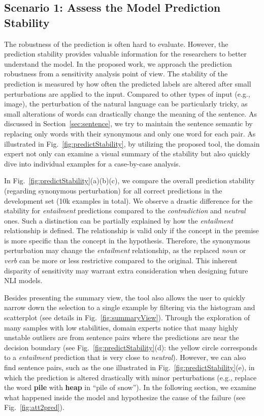 \subsection{Scenario 1: Assess the Model Prediction Stability}
The robustness of the prediction is often hard to evaluate. However, the prediction stability provides valuable information for the researchers to better understand the model.
%
In the proposed work, we approach the prediction robustness from a sensitivity analysis point of view. The stability of the prediction is measured by how often the predicted labels are altered after small perturbations are applied to the input.
%
Compared to other types of input (e.g., image), the perturbation of the natural language can be particularly tricky, as small alterations of words can drastically change the meaning of the sentence. As discussed in Section~\ref{sec:sentence}, we try to maintain the sentence semantic by replacing only words with their synonymous and only one word for each pair.
As illustrated in Fig.~\ref{fig:predictStability}, by utilizing the proposed tool, the domain expert not only can examine a visual summary of the stability but also quickly dive into individual examples for a case-by-case analysis.

In Fig.~\ref{fig:predictStability}(a)(b)(c), we compare the overall prediction stability (regarding synonymous perturbation) for all correct predictions in the development set (10k examples in total).
%
We observe a drastic difference for the stability for \emph{entailment} predictions compared to the \emph{contradiction} and \emph{neutral} ones.
%
Such a distinction can be partially explained by how the \emph{entailment} relationship is defined. The relationship is valid only if the concept in the premise is more specific than the concept in the hypothesis. Therefore, the synonymous perturbation may change the \emph{entailment} relationship, as the replaced \emph{noun} or \emph{verb} can be more or less restrictive compared to the original.
This inherent disparity of sensitivity may warrant extra consideration when designing future NLI models.

Besides presenting the summary view, the tool also allows the user to quickly narrow down the selection to a single example by filtering via the histogram and scatterplot (see details in Fig.~\ref{fig:summaryView}).
%
Through the exploration of many samples with low stabilities, domain experts notice that many highly unstable outliers are from sentence pairs where the predictions are near the decision boundary (see Fig.~\ref{fig:predictStability}(d): the yellow circle corresponds to a \emph{entailment} prediction that is very close to \emph{neutral}).
%
However, we can also find sentence pairs, such as the one illustrated in Fig.~\ref{fig:predictStability}(e), in which the prediction is altered drastically with minor perturbations (e.g., replace the word \textbf{pile} with \textbf{heap} in ``pile of snow''). In the following section, we examine what happened inside the model and hypothesize the cause of the failure (see Fig.~\ref{fig:att2pred}).

